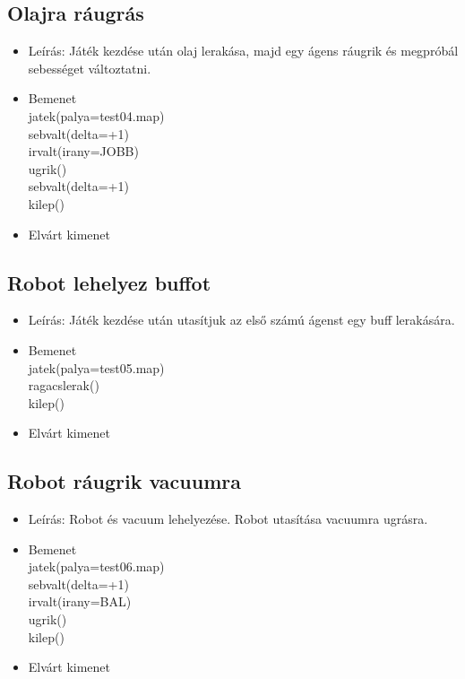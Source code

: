 \subsection{Olajra ráugrás}
\begin{itemize}
	\item Leírás: Játék kezdése után olaj lerakása, majd egy ágens ráugrik és megpróbál sebességet változtatni. 
	\item Bemenet\\	
    jatek(palya=test04.map)\\
    sebvalt(delta=+1)\\
    irvalt(irany=JOBB)\\
    ugrik()\\
    sebvalt(delta=+1)\\
    kilep()\\
	\item Elvárt kimenet\\

\end{itemize}

\subsection{Robot lehelyez buffot}
\begin{itemize}
	\item Leírás: Játék kezdése után utasítjuk az első számú ágenst egy buff lerakására.
	\item Bemenet\\	
    jatek(palya=test05.map)\\
    ragacslerak()\\
    kilep()\\
	\item Elvárt kimenet\\
		
\end{itemize}

\subsection{Robot ráugrik vacuumra}
\begin{itemize}
	\item Leírás: Robot és vacuum lehelyezése. Robot utasítása vacuumra ugrásra.
	\item Bemenet\\
    jatek(palya=test06.map)\\
    sebvalt(delta=+1)\\
    irvalt(irany=BAL)\\
    ugrik()\\
    kilep()\\
	\item Elvárt kimenet\\

\end{itemize}

